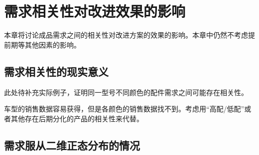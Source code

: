
\chapter{需求相关性对改进效果的影响}

本章将讨论成品需求之间的相关性对改进方案的效果的影响。本章中仍然不考虑提前期等其他因素的影响。

\section{需求相关性的现实意义}

此处待补充实际例子，证明同一型号不同颜色的配件需求之间可能存在相关性。

车型的销售数据容易获得，但是各颜色的销售数据找不到。考虑用“高配/低配”或者其他存在后期分化的产品的相关性来代替。






\section{需求服从二维正态分布的情况}

